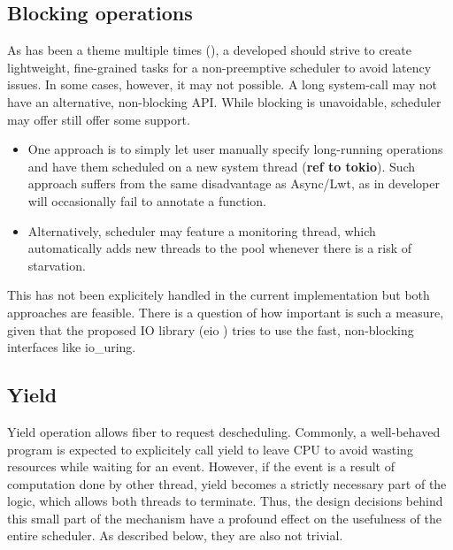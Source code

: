 \documentclass[12pt,a4paper,twoside]{report}
\begin{document}
\subsection{Blocking operations}
As has been a theme multiple times (), a developed should strive to create lightweight, fine-grained tasks for a non-preemptive scheduler to avoid latency issues. In some cases, however, it may not possible. A long system-call may not have an alternative, non-blocking API. While blocking is unavoidable, scheduler may offer still offer some support.
\begin{itemize}
    \item One approach is to simply let user manually specify long-running operations and have them scheduled on a new system thread (\textbf{ref to tokio}). Such approach suffers from the same disadvantage as Async/Lwt, as in developer will occasionally fail to annotate a function.
    \item Alternatively, scheduler may feature a monitoring thread, which automatically adds new threads to the pool whenever there is a risk of starvation.  
\end{itemize}

This has not been explicitely handled in the current implementation but both approaches are feasible. There is a question of how important is such a measure, given that the proposed IO library (eio ) tries to use the fast, non-blocking interfaces like io\_uring.

\subsection{Yield}
\label{section:yield}

Yield operation allows fiber to request descheduling. Commonly, a well-behaved program is expected to explicitely call yield to leave CPU to avoid wasting resources while waiting for an event. However, if the event is a result of computation done by other thread, yield becomes a strictly necessary part of the logic, which allows both threads to terminate. Thus, the design decisions behind this small part of the mechanism have a profound effect on the usefulness of the entire scheduler. As described below, they are also not trivial.
\end{document}
